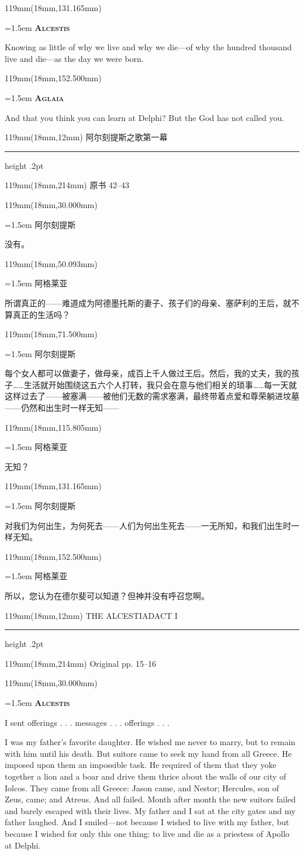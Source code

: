 \documentclass{article}
\newcommand{\ENsetup}{\normalfont\color{ink}\fontsize{11}{16.5}\selectfont\emergencystretch=1.5em}
\newcommand{\ZHsetup}{\normalfont\color{ink}\fontsize{10.5}{17}\selectfont\emergencystretch=1.5em}
\newcommand{\ENspeaker}[1]{{\fontsize{9.8}{13}\selectfont\scshape\bfseries #1}\par\vspace{3pt}}
\newcommand{\ZHspeaker}[1]{{\hei\fontsize{10.3}{13}\selectfont #1}\par\vspace{3pt}}
\newcommand{\ENstage}[1]{\par\noindent{\itshape #1}\par}
\newcommand{\Block}[3]{\begin{textblock*}{119mm}(18mm,#1mm){#2 #3\par}\end{textblock*}}
\newcommand{\Heading}[3]{%
  \begin{textblock*}{119mm}(18mm,12mm)
    \color{quiet}\fontsize{7.5}{10}\selectfont
    #1\hfill #2\par\vspace{3mm}\hrule height .2pt
  \end{textblock*}
  \begin{textblock*}{119mm}(18mm,214mm)
    \color{quiet}\fontsize{7}{10}\selectfont #3\hfill\thepage
  \end{textblock*}
}
\begin{document}
\Block{131.165}{\ENsetup}{\ENspeaker{Alcestis}
Knowing as little of why we live and why we die—of why the hundred thousand live and die—as the day we were born.\par}
\Block{152.500}{\ENsetup}{\ENspeaker{Aglaia}
\ENstage{Dryly.}
And that you think you can learn at Delphi? But the God has not called you.\par}
\newpage
\null
\Heading{阿尔刻提斯之歌}{第一幕}{原书 42–43}
\Block{30.000}{\ZHsetup}{\ZHspeaker{阿尔刻提斯}{\kai （低声，羞愧地）}没有。\par }
\Block{50.093}{\ZHsetup}{\ZHspeaker{阿格莱亚}所谓真正的——难道成为阿德墨托斯的妻子、孩子们的母亲、塞萨利的王后，就不算真正的生活吗？\par }
\Block{71.500}{\ZHsetup}{\ZHspeaker{阿尔刻提斯}每个女人都可以做妻子，做母亲，成百上千人做过王后。然后，我的丈夫，我的孩子……生活就开始围绕这五六个人打转，我只会在意与他们相关的琐事……每一天就这样过去了——被塞满——被他们无数的需求塞满，最终带着点爱和尊荣躺进坟墓——仍然和出生时一样无知——\par }
\Block{115.805}{\ZHsetup}{\ZHspeaker{阿格莱亚}无知？\par }
\Block{131.165}{\ZHsetup}{\ZHspeaker{阿尔刻提斯}对我们为何出生，为何死去——人们为何出生死去——一无所知，和我们出生时一样无知。\par }
\Block{152.500}{\ZHsetup}{\ZHspeaker{阿格莱亚}{\kai （不带感情地）}所以，您认为在德尔斐可以知道？但神并没有呼召您啊。\par }
\newpage
\null
\Heading{THE ALCESTIAD}{ACT I}{Original pp. 15–16}
\Block{30.000}{\ENsetup}{\ENspeaker{Alcestis}
\ENstage{In shame.}
I sent offerings . . . messages . . . offerings . . .\par
\ENstage{Pause.}
I was my father's favorite daughter. He wished me never to marry, but to remain with him until his death. But suitors came to seek my hand from all Greece. He imposed upon them an impossible task. He required of them that they yoke together a lion and a boar and drive them thrice about the walls of our city of Iolcos. They came from all Greece: Jason came, and Nestor; Hercules, son of Zeus, came; and Atreus. And all failed. Month after month the new suitors failed and barely escaped with their lives. My father and I sat at the city gates and my father laughed. And I smiled—not because I wished to live with my father, but because I wished for only this one thing: to live and die as a priestess of Apollo at Delphi.\par}
\end{document}
